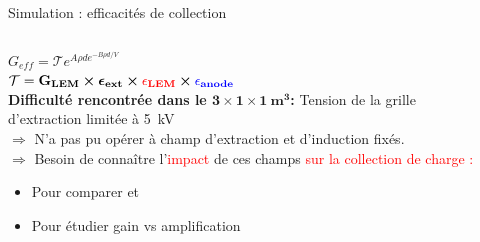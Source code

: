     \begin{frame}{Simulation : efficacités de collection}
    	\begin{scriptsize}
    		\begin{columns}
    			\hspace{-1.5cm}
	    		\begin{column}{0.3\textwidth}
	    			$G_{eff} = \mathcal{T}e^{A\rho d e^{-B\rho d/V}}$\\
	    			$\mathbf{\mathcal{T}=G_{LEM}\boldsymbol{\times}\boldsymbol{\epsilon}_{ext} \boldsymbol{\times}\textcolor{red}{\epsilon_{LEM}}\boldsymbol{\times} \textcolor{blue}{\epsilon_{anode}}}$\\
	    			\vspace{0.6cm}
	    			\textbf{Difficulté rencontrée dans le $\mathbf{3 \times 1 \times \SI[detect-weight]{1}{\meter\cubed}}$:} Tension de la grille d'extraction limitée à \SI{5}{\kilo\volt}\\
	    			\vspace{0.3cm}
	    			$\Rightarrow$ N'a pas pu opérer à champ d'extraction et d'induction fixés.\\
	    			$\Rightarrow$ Besoin de connaître l'\textcolor{red}{impact} de ces champs \textcolor{red}{sur la collection de charge : }\\
	    			\begin{itemize}
                        \item Pour comparer \TOO{} et \threeL{}
                        \item Pour étudier gain vs amplification
                    \end{itemize}
	    		\end{column}\hfill\hspace{-3.2cm}
	    		\begin{column}{0.65\textwidth}

\end{column}
\end{columns}
\end{scriptsize}
\end{frame}
